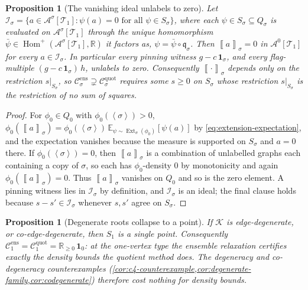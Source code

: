 \documentclass[11pt]{article}
\newtheorem{proposition}[theorem]{Proposition}
\theoremstyle{definition}
\newcommand{\R}{\mathbb{R}}
\newcommand{\E}{\mathbb{E}}
\newcommand{\A}{\mathcal{A}}
\newcommand{\K}{\mathcal{K}}
\newcommand{\T}{\mathcal{T}}
\newcommand{\C}{\mathcal{C}}
\newcommand{\Homp}{\operatorname{Hom}^{+}}
\newcommand{\Ext}{\operatorname{Ext}}
\newcommand{\brak}[1]{\left\langle #1\right\rangle}
\newcommand{\avg}[2]{\left\llbracket #1 \right\rrbracket_{#2}}
\newcommand{\qmap}{\mathfrak q}
\newcommand{\one}{\mathbf 1}
\begin{document}
\begin{proposition}[The vanishing ideal unlabels to zero]\label{prop:ideal-zero}
Let $\mathcal I_\sigma=\{a\in\A^\sigma[\T_1]:\psi(a)=0\text{ for all }\psi\in S_\sigma\}$,
where each $\psi\in S_\sigma\subseteq Q_\sigma$ is evaluated on $\A^\sigma[\T_1]$ through
the unique homomorphism $\bar\psi\in\Homp(\A^\sigma[\T_1],\R)$ it factors as,
$\psi=\bar\psi\circ\qmap_\sigma$.
Then $\avg{a}{\sigma}=0$ in $\A^0[\T_1]$ for every $a\in\mathcal I_\sigma$.  In
particular every pinning witness $g-c\,\one_\sigma$, and every flag-multiple
$(g-c\,\one_\sigma)\,h$, unlabels to zero.  Consequently $\avg{\cdot}{\sigma}$ depends
only on the restriction $s|_{S_\sigma}$, so
$\C^{\mathrm{ens}}_\sigma\supsetneq\C^{\mathrm{quot}}_\sigma$ requires some $s\ge0$ on
$S_\sigma$ whose restriction $s|_{S_\sigma}$ is the restriction of no sum of squares.
\end{proposition}

\begin{proof}
For $\phi_0\in Q_0$ with $\phi_0(\brak\sigma)>0$,
$\phi_0(\avg{a}{\sigma})=\phi_0(\brak\sigma)\,\E_{\psi\sim\Ext_\sigma(\phi_0)}[\psi(a)]$
by \eqref{eq:extension-expectation}, and the expectation vanishes because the measure is
supported on $S_\sigma$ and $a=0$ there.  If $\phi_0(\brak\sigma)=0$, then
$\avg{a}{\sigma}$ is a combination of unlabelled graphs each containing a copy of
$\sigma$, so each has $\phi_0$-density $0$ by monotonicity and again
$\phi_0(\avg{a}{\sigma})=0$.  Thus $\avg{a}{\sigma}$ vanishes on $Q_0$ and so is the zero
element.  A pinning witness lies in $\mathcal I_\sigma$ by definition, and
$\mathcal I_\sigma$ is an ideal; the final clause holds because
$s-s'\in\mathcal I_\sigma$ whenever $s,s'$ agree on $S_\sigma$.
\end{proof}

\begin{proposition}[Degenerate roots collapse to a point]\label{prop:single-point}
If $\K$ is edge-degenerate, or co-edge-degenerate, then $S_1$ is a single point.
Consequently $\C^{\mathrm{ens}}_1=\C^{\mathrm{quot}}_1=\R_{\ge0}\,\one_0$: at the
one-vertex type the ensemble relaxation certifies exactly the density bounds the
quotient method does.  The degeneracy and co-degeneracy counterexamples
(\cref{cor:c4-counterexample,cor:degenerate-family,cor:codegenerate}) therefore cost
nothing for density bounds.
\end{proposition}
\end{document}
